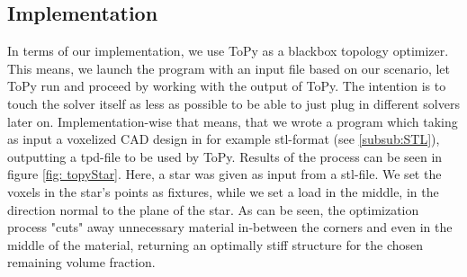 \subsection{Implementation}
In terms of our implementation, we use ToPy as a blackbox topology optimizer. This means, we launch the program with an input file based on our scenario, let ToPy run and proceed by working with the output of ToPy. The intention is to touch the solver itself as less as possible to be able to just plug in different solvers later on. Implementation-wise that means, that we wrote a program which taking as input a voxelized CAD design in for example stl-format (see \autoref{subsub:STL}), outputting a tpd-file to be used by ToPy. Results of the process can be seen in figure \ref{fig: topyStar}. Here, a star was given as input from a stl-file. We set the voxels in the star's points as fixtures, while we set a load in the middle, in the direction normal to the plane of the star. As can be seen, the optimization process "cuts" away unnecessary material in-between the corners and even in the middle of the material, returning an optimally stiff structure for the chosen remaining volume fraction. 
